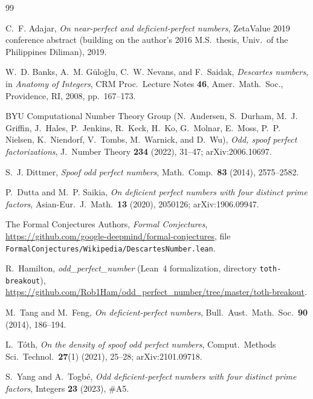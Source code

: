 \documentclass[11pt]{amsart}
\theoremstyle{definition}
\theoremstyle{remark}
\begin{document}
\begin{thebibliography}{99}

C.~F. Adajar, \emph{On near-perfect and deficient-perfect numbers}, ZetaValue 2019 conference abstract (building on the author's 2016 M.S.\ thesis, Univ.\ of the Philippines Diliman), 2019.

W.~D. Banks, A.~M. G\"ulo\u{g}lu, C.~W. Nevans, and F.~Saidak, \emph{Descartes numbers}, in \emph{Anatomy of Integers}, CRM Proc.\ Lecture Notes \textbf{46}, Amer.\ Math.\ Soc., Providence, RI, 2008, pp.~167--173.

BYU Computational Number Theory Group (N.~Andersen, S.~Durham, M.~J. Griffin, J.~Hales, P.~Jenkins, R.~Keck, H.~Ko, G.~Molnar, E.~Moss, P.~P. Nielsen, K.~Niendorf, V.~Tombs, M.~Warnick, and D.~Wu), \emph{Odd, spoof perfect factorizations}, J.\ Number Theory \textbf{234} (2022), 31--47; arXiv:2006.10697.

S.~J. Dittmer, \emph{Spoof odd perfect numbers}, Math.\ Comp.\ \textbf{83} (2014), 2575--2582.

P.~Dutta and M.~P. Saikia, \emph{On deficient perfect numbers with four distinct prime factors}, Asian-Eur.\ J.\ Math.\ \textbf{13} (2020), 2050126; arXiv:1906.09947.

The Formal Conjectures Authors, \emph{Formal Conjectures}, \url{https://github.com/google-deepmind/formal-conjectures}, file \texttt{FormalConjectures/Wikipedia/DescartesNumber.lean}.

R.~Hamilton, \emph{odd\_perfect\_number} (Lean~4 formalization, directory \texttt{toth-breakout}), \url{https://github.com/Rob1Ham/odd_perfect_number/tree/master/toth-breakout}.

M.~Tang and M.~Feng, \emph{On deficient-perfect numbers}, Bull.\ Aust.\ Math.\ Soc.\ \textbf{90} (2014), 186--194.

L.~T\'oth, \emph{On the density of spoof odd perfect numbers}, Comput.\ Methods Sci.\ Technol.\ \textbf{27}(1) (2021), 25--28; arXiv:2101.09718.

S.~Yang and A.~Togb\'e, \emph{Odd deficient-perfect numbers with four distinct prime factors}, Integers \textbf{23} (2023), \#A5.

\end{thebibliography}
\end{document}
